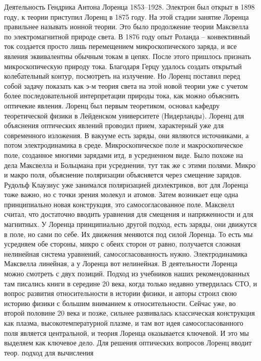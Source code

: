 \documentclass[a4paper, 12pt]{article}
\begin{document}
Деятельность Гендрика Антона Лоренца 1853--1928. Электрон был открыт 
в 1898 году, к теории приступил Лоренц в 1875 году. На этой стадии 
занятие Лоренца правильнее называть ионной теории. Это было продолжение 
теории Максвелла по электромагнитной природе света. В 1876 году опыт 
Роланда -- конвективный ток создается просто лишь перемещением 
микроскопического заряда, и все явления эквивалентны обычным токам 
в цепях. После этого пришлось признать микроскопическую природу тока. 
Благодаря Герцу удалось создать открытый колебательный контур, 
посмотреть на излучение. Но Лоренц поставил перед собой задачу показать 
как э-м теория света на этой новой теории уже с учетом более 
последовательной интерпретации природы тока, как можно объяснить 
оптичекие явления. Лоренц был первым теоретиком, основал кафедру 
теоретической физики в Лейденском университете (Нидерланды). Лоренц для 
объяснения оптических явлений проводил прием, характерный уже для 
современного изложения. В вакууме есть заряды, они являются источниками, 
а потом электродинамика в среде. Микроскопическое поле 
и макроскопическое поле, созданное многими зарядами итд, в усредненном 
виде. Было похоже на дела Максвелла и Больцмана при усреднении, тут так 
же с этими полями. Микро и макро поля, объяснение поляризации 
объясняется через смещение зарядов. Рудольф Клаузиус уже занимался 
поляризацией диэлектриков, вот для Лоренца тоже важно, но с точки зрения 
молекул и атомов. Затем возникает еще одна принципиально новая 
конструкция, это самосогласованное поле. Максвелл считал, что достаточно 
вводить уравнения для смещения и напряженности и для магнитных. 
У Лоренца принципиально другой подход, есть заряды, они движутся в поле, 
но сами по себе. Их движения меняются под силой Лоренца. То есть мы 
усредняем обе стороны, микро с обеих сторон от равно, получается сложная 
нелинейная система уравнений, самосогласованность нужно. Электродинамика 
Максвелла линейная, а у Лоренца вот нелинейная. В деятельности Лоренца 
можно смотреть с двух позиций. Подход из учебников наших рекомендованных 
там писались книги в середине 20 века, когда только недавно утвердилась 
СТО, и вопрос развития относительности в истории физики, и авторы строил 
свою историю физики с большим вниманием к относительности. Сейчас уже, 
во второй половине 20 века и позже, сильнее развивалась классическая 
конструкция как плазма, высокотемпературной плазме, и там вот идея 
самосогласованного поля является центральной, и теория Лоренца 
оказывается ключевой. И это мы выделяем как ключевое дело. Для решения 
оптических вопросов Лоренц вводит теор. подход для вычисления 
\end{document}
